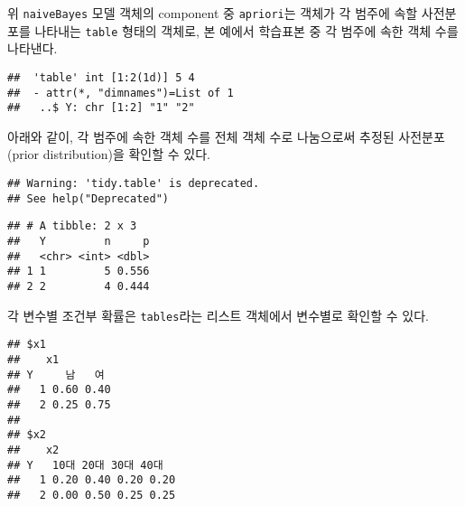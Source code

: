 \documentclass[
]{book}
\newenvironment{Shaded}{\begin{snugshade}}{\end{snugshade}}
\newcommand{\AttributeTok}[1]{\textcolor[rgb]{0.77,0.63,0.00}{#1}}
\newcommand{\FunctionTok}[1]{\textcolor[rgb]{0.00,0.00,0.00}{#1}}
\newcommand{\NormalTok}[1]{#1}
\newcommand{\SpecialCharTok}[1]{\textcolor[rgb]{0.00,0.00,0.00}{#1}}
\begin{document}
위 \texttt{naiveBayes} 모델 객체의 component 중 \texttt{apriori}는 객체가 각 범주에 속할 사전분포를 나타내는 \texttt{table} 형태의 객체로, 본 예에서 학습표본 중 각 범주에 속한 객체 수를 나타낸다.

\begin{Shaded}
\end{Shaded}

\begin{verbatim}
##  'table' int [1:2(1d)] 5 4
##  - attr(*, "dimnames")=List of 1
##   ..$ Y: chr [1:2] "1" "2"
\end{verbatim}

아래와 같이, 각 범주에 속한 객체 수를 전체 객체 수로 나눔으로써 추정된 사전분포(prior distribution)을 확인할 수 있다.

\begin{Shaded}
\end{Shaded}

\begin{verbatim}
## Warning: 'tidy.table' is deprecated.
## See help("Deprecated")
\end{verbatim}

\begin{verbatim}
## # A tibble: 2 x 3
##   Y         n     p
##   <chr> <int> <dbl>
## 1 1         5 0.556
## 2 2         4 0.444
\end{verbatim}

각 변수별 조건부 확률은 \texttt{tables}라는 리스트 객체에서 변수별로 확인할 수 있다.

\begin{Shaded}
\end{Shaded}

\begin{verbatim}
## $x1
##    x1
## Y     남   여
##   1 0.60 0.40
##   2 0.25 0.75
## 
## $x2
##    x2
## Y   10대 20대 30대 40대
##   1 0.20 0.40 0.20 0.20
##   2 0.00 0.50 0.25 0.25
\end{verbatim}
\end{document}
